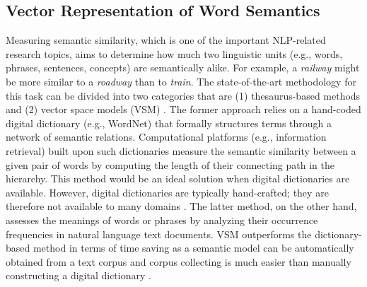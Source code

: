 \documentclass[Journal, BackFigs,NoLists, DoubleSpace]{ascelike}%
\begin{document}
\subsection{Vector Representation of Word Semantics}
%
Measuring semantic similarity, which is one of the important NLP-related research topics, aims to determine how much two linguistic units (e.g., words, phrases, sentences, concepts) are semantically alike. For example, a \textit{railway} might be more similar to a \textit{roadway} than to \textit{train}. The state-of-the-art methodology for this task can be divided into two categories that are (1) thesaurus-based methods and (2) vector space models (VSM) \cite{harispe13}. The former approach relies on a hand-coded digital dictionary (e.g., WordNet) that formally structures terms through a network of semantic relations. Computational platforms (e.g., information retrieval) built upon such dictionaries measure the semantic similarity between a given pair of words by computing the length of their connecting path in the hierarchy. This method would be an ideal solution when digital dictionaries are available. However, digital dictionaries are typically hand-crafted; they are therefore not available to many domains \cite{kolb08}. The latter method, on the other hand, assesses the meanings of words or phrases by analyzing their occurrence frequencies in natural language text documents. VSM outperforms the dictionary-based method in terms of time saving as a semantic model can be automatically obtained from a text corpus and corpus collecting is much easier than manually constructing a digital dictionary \cite{turney10}.
%
\par
\end{document}
